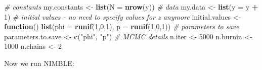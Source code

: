 \documentclass[
  12pt,
]{krantz}
\newenvironment{Shaded}{\begin{snugshade}}{\end{snugshade}}
\newcommand{\AttributeTok}[1]{\textcolor[rgb]{0.13,0.29,0.53}{#1}}
\newcommand{\CommentTok}[1]{\textcolor[rgb]{0.56,0.35,0.01}{\textit{#1}}}
\newcommand{\ControlFlowTok}[1]{\textcolor[rgb]{0.13,0.29,0.53}{\textbf{#1}}}
\newcommand{\DecValTok}[1]{\textcolor[rgb]{0.00,0.00,0.81}{#1}}
\newcommand{\FunctionTok}[1]{\textcolor[rgb]{0.13,0.29,0.53}{\textbf{#1}}}
\newcommand{\NormalTok}[1]{#1}
\newcommand{\OtherTok}[1]{\textcolor[rgb]{0.56,0.35,0.01}{#1}}
\newcommand{\SpecialCharTok}[1]{\textcolor[rgb]{0.81,0.36,0.00}{\textbf{#1}}}
\newcommand{\StringTok}[1]{\textcolor[rgb]{0.31,0.60,0.02}{#1}}
\begin{document}
\begin{Shaded}
\begin{Highlighting}[]
\CommentTok{\# constants}
\NormalTok{my.constants }\OtherTok{\textless{}{-}} \FunctionTok{list}\NormalTok{(}\AttributeTok{N =} \FunctionTok{nrow}\NormalTok{(y))}
\CommentTok{\# data}
\NormalTok{my.data }\OtherTok{\textless{}{-}} \FunctionTok{list}\NormalTok{(}\AttributeTok{y =}\NormalTok{ y }\SpecialCharTok{+} \DecValTok{1}\NormalTok{)}
\CommentTok{\# initial values {-} no need to specify values for z anymore}
\NormalTok{initial.values }\OtherTok{\textless{}{-}} \ControlFlowTok{function}\NormalTok{() }\FunctionTok{list}\NormalTok{(}\AttributeTok{phi =} \FunctionTok{runif}\NormalTok{(}\DecValTok{1}\NormalTok{,}\DecValTok{0}\NormalTok{,}\DecValTok{1}\NormalTok{),}
                                  \AttributeTok{p =} \FunctionTok{runif}\NormalTok{(}\DecValTok{1}\NormalTok{,}\DecValTok{0}\NormalTok{,}\DecValTok{1}\NormalTok{))}
\CommentTok{\# parameters to save}
\NormalTok{parameters.to.save }\OtherTok{\textless{}{-}} \FunctionTok{c}\NormalTok{(}\StringTok{"phi"}\NormalTok{, }\StringTok{"p"}\NormalTok{)}
\CommentTok{\# MCMC details}
\NormalTok{n.iter }\OtherTok{\textless{}{-}} \DecValTok{5000}
\NormalTok{n.burnin }\OtherTok{\textless{}{-}} \DecValTok{1000}
\NormalTok{n.chains }\OtherTok{\textless{}{-}} \DecValTok{2}
\end{Highlighting}
\end{Shaded}

Now we run NIMBLE:
\end{document}
